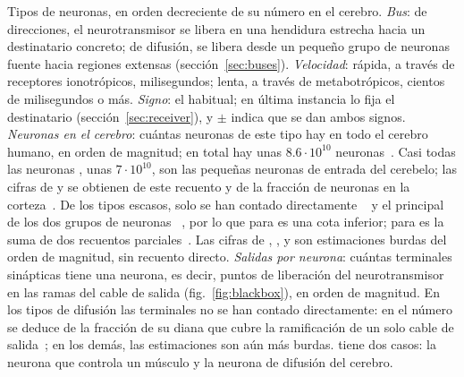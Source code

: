 \begin{table}[t]
\caption{Tipos de neuronas, en orden decreciente de su número en el cerebro. \emph{Bus}: de direcciones, el neurotransmisor se libera en una hendidura estrecha hacia un destinatario concreto; de difusión, se libera desde un pequeño grupo de neuronas fuente hacia regiones extensas (sección~\ref{sec:buses}). \emph{Velocidad}: rápida, a través de receptores ionotrópicos, milisegundos; lenta, a través de metabotrópicos, cientos de milisegundos o más. \emph{Signo}: el habitual; en última instancia lo fija el destinatario (sección~\ref{sec:receiver}), y $\pm$ indica que se dan ambos signos. \emph{Neuronas en el cerebro}: cuántas neuronas de este tipo hay en todo el cerebro humano, en orden de magnitud; en total hay unas $8.6\cdot10^{10}$ neuronas~\cite{Azevedo2009}. Casi todas las neuronas , unas $7\cdot10^{10}$, son las pequeñas neuronas de entrada del cerebelo; las cifras de  y  se obtienen de este recuento y de la fracción de neuronas  en la corteza~\cite{Hendry1987}. De los tipos escasos, solo se han contado directamente ~\cite{Airaksinen1991} y el principal de los dos grupos de neuronas ~\cite{Pakkenberg1991}, por lo que para  es una cota inferior; para  es la suma de dos recuentos parciales~\cite{Baker1990,Baker1991}. Las cifras de , ,  y  son estimaciones burdas del orden de magnitud, sin recuento directo. \emph{Salidas por neurona}: cuántas terminales sinápticas tiene una neurona, es decir, puntos de liberación del neurotransmisor en las ramas del cable de salida (fig.~\ref{fig:blackbox}), en orden de magnitud. En los tipos de difusión las terminales no se han contado directamente: en  el número se deduce de la fracción de su diana que cubre la ramificación de un solo cable de salida~\cite{Matsuda2009}; en los demás, las estimaciones son aún más burdas.  tiene dos casos: la neurona que controla un músculo y la neurona de difusión del cerebro.}
\label{tab:types}
\end{table}

